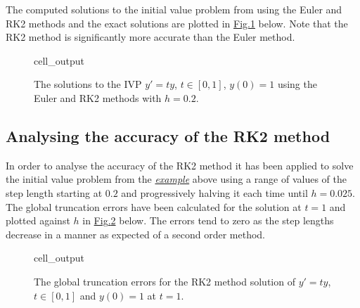 \documentclass[letterpaper,10pt,english]{jupyterBook}
\begin{document}
\sphinxAtStartPar
The computed solutions to the initial value problem from {\hyperref[\detokenize{1_IVPs/1.4_RK2:rk2-example}]{}} using the Euler and RK2 methods and the exact solutions are plotted in \hyperref[\detokenize{1_IVPs/1.4_RK2:rk2-example-figure}]{Fig.\@ \ref{\detokenize{1_IVPs/1.4_RK2:rk2-example-figure}}} below. Note that the RK2 method is significantly more accurate than the Euler method.

\begin{figure}[htbp]
\centering
\capstart
\begin{sphinxVerbatimOutput}

\begin{sphinxuseclass}{cell_output}
\noindent{}

\end{sphinxuseclass}\end{sphinxVerbatimOutput}
\caption{The solutions to the IVP \(y'=ty\), \(t\in[0,1]\), \(y(0)=1\) using the Euler and RK2 methods with \(h=0.2\).}\label{\detokenize{1_IVPs/1.4_RK2:rk2-example-figure}}\end{figure}


\subsection{Analysing the accuracy of the RK2 method}
\label{\detokenize{1_IVPs/1.4_RK2:analysing-the-accuracy-of-the-rk2-method}}
\sphinxAtStartPar
In order to analyse the accuracy of the RK2 method it has been applied to solve the initial value problem from the {\hyperref[\detokenize{1_IVPs/1.4_RK2:rk2-example}]{\emph{example}}} above using a range of values of the step length starting at \(0.2\) and progressively halving it each time until \(h=0.025\). The global truncation errors have been calculated for the solution at \(t=1\) and plotted against \(h\) in \hyperref[\detokenize{1_IVPs/1.4_RK2:rk2-gte-figure}]{Fig.\@ \ref{\detokenize{1_IVPs/1.4_RK2:rk2-gte-figure}}} below. The errors tend to zero as the step lengths decrease in a  manner as expected of a second order method.

\begin{figure}[htbp]
\centering
\capstart
\begin{sphinxVerbatimOutput}

\begin{sphinxuseclass}{cell_output}
\noindent{}

\end{sphinxuseclass}\end{sphinxVerbatimOutput}
\caption{The global truncation errors for the RK2 method solution of  \(y' = t y\), \(t\in [0, 1]\) and \(y(0)=1\) at \(t=1\).}\label{\detokenize{1_IVPs/1.4_RK2:rk2-gte-figure}}\end{figure}
\end{document}
